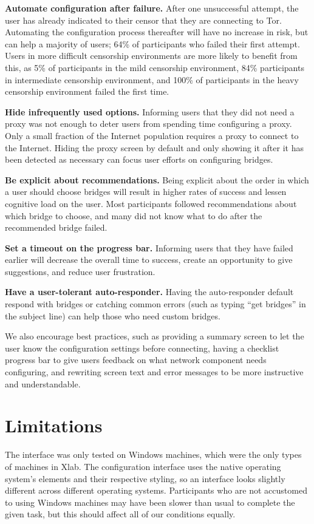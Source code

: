 \documentclass[USenglish,oneside,twocolumn]{article}
\begin{document}
\begin{description}
\item {\bfseries Automate configuration after failure.} After one unsuccessful attempt, the user has already indicated to their censor that they are connecting to Tor. Automating the configuration process thereafter will have no increase in risk, but can help a majority of users; 64\% of participants who failed their first attempt. Users in more difficult censorship environments are more likely to benefit from this, as 5\% of participants in the mild censorship environment, 84\% participants in intermediate censorship environment, and 100\% of participants in the heavy censorship environment failed the first time.
\item{\bfseries Hide infrequently used options.} Informing users that they did not need a proxy was not enough to deter users from spending time configuring a proxy. Only a small fraction of the Internet population requires a proxy to connect to the Internet. Hiding the proxy screen by default and only showing it after it has been detected as necessary can focus user efforts on configuring bridges.
\item {\bfseries Be explicit about recommendations.} Being explicit about the order in which a user should choose bridges will result in higher rates of success and lessen cognitive load on the user. Most participants followed recommendations about which bridge to choose, and many did not know what to do after the recommended bridge failed. 
\item{\bfseries Set a timeout on the progress bar.} Informing users that they have failed earlier will decrease the overall time to success, create an opportunity to give suggestions, and reduce user frustration. 
\item{\bfseries Have a user-tolerant auto-responder.} Having the auto-responder default respond with bridges or catching common errors (such as typing ``get bridges'' in the subject line) can help those who need custom bridges. 
\end{description} 

We also encourage best practices, such as providing a summary screen to let the user know the configuration settings before connecting, having a checklist progress bar to give users feedback on what network component needs configuring, and rewriting screen text and error messages to be more instructive and understandable. 

\section{Limitations} 
The interface was only tested on Windows machines, which were the only types of machines in Xlab. The configuration interface uses the native operating system's elements and their respective styling, so an interface looks slightly different across different operating systems. Participants who are not accustomed to using Windows machines may have been slower than usual to complete the given task, but this should affect all of our conditions equally. 
\end{document}

